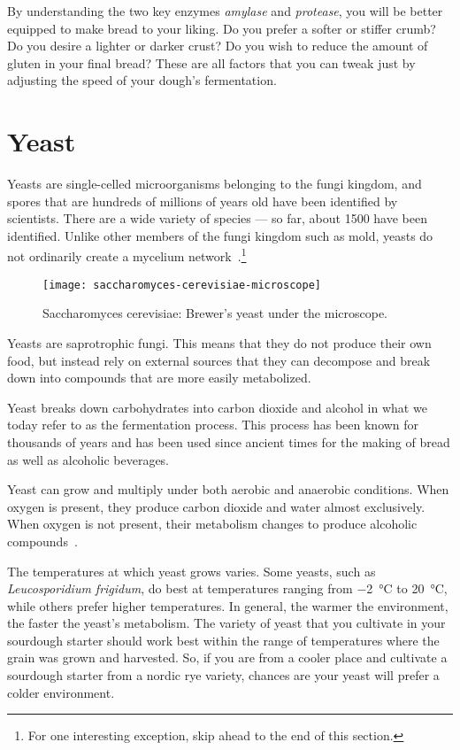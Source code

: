 By understanding the two key enzymes \emph{amylase} and \emph{protease}, you
will be better equipped to make bread to your liking. Do you prefer a softer
or stiffer crumb? Do you desire a lighter or darker crust? Do you wish to reduce
the amount of gluten in your final bread? These are all factors that you can
tweak just by adjusting the speed of your dough's fermentation.

\section{Yeast}

Yeasts are single-celled microorganisms belonging to the fungi kingdom, and
spores that are hundreds of millions of years old have been identified by
scientists. There are a wide variety of species --- so far, about \num{1500} have been
identified. Unlike other members of the fungi kingdom such as mold, yeasts do
not ordinarily create a mycelium network~\cite{molecular+mechanisms+yeast}.\footnote{For
one interesting exception, skip ahead to the end of this section.}

\begin{figure}[!htb]
\begin{center}
  \texttt{[image: saccharomyces-cerevisiae-microscope]}
  \caption[Brewer's yeast]{Saccharomyces cerevisiae: Brewer's yeast under the
      microscope.}%
  \label{saccharomyces-cerevisiae-microscope}
\end{center}
\end{figure}

Yeasts are saprotrophic fungi. This means that they do not produce their own
food, but instead rely on external sources that they can decompose and break
down into compounds that are more easily metabolized.

Yeast breaks down carbohydrates into carbon dioxide and alcohol in what we today
refer to as the fermentation process. This process has been known for thousands
of years and has been used since ancient times for the making of bread as well
as alcoholic beverages.

Yeast can grow and multiply under both aerobic and anaerobic conditions. When
oxygen is present, they produce carbon dioxide and water almost exclusively.
When oxygen is not present, their metabolism changes to produce alcoholic
compounds~\cite{effects+oxygen+yeast+growth}.

The temperatures at which yeast grows varies. Some yeasts, such as
\emph{Leucosporidium frigidum}, do best at temperatures ranging from \qty{-2}{\degreeCelsius} to
 \qty{20}{\degreeCelsius}, while others prefer higher temperatures. In general, the warmer the
environment, the faster the yeast's metabolism. The variety of yeast
that you cultivate in your sourdough starter should work best within the range
of temperatures where the grain was grown and harvested. So, if you are from a
cooler place and cultivate a sourdough starter from a nordic rye variety,
chances are your yeast will prefer a colder environment.

